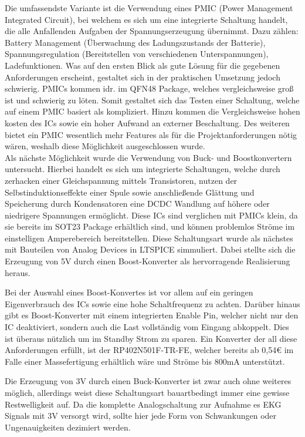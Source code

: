 Die umfassendste Variante ist die Verwendung eines PMIC (Power Management Integrated Circuit), bei welchem es sich um eine integrierte Schaltung handelt, die alle Anfallenden Aufgaben der Spannungserzeugung übernimmt. Dazu zählen: Battery Management (Überwachung des Ladungszustands der Batterie), Spannungsregulation (Bereitstellen von verschiedenen Unterspannungen), Ladefunktionen. Was auf den ersten Blick als gute Lösung für die gegebenen Anforderungen erscheint, gestaltet sich in der praktischen Umsetzung jedoch schwierig. PMICs kommen idr. im QFN48 Package, welches vergleichsweise groß ist und schwierig zu löten. Somit gestaltet sich das Testen einer Schaltung, welche auf einem PMIC basiert als kompliziert. Hinzu kommen die Vergleichsweise hohen kosten des ICs sowie ein hoher Aufwand an externer Beschaltung. Des weiteren bietet ein PMIC wesentlich mehr Features als für die Projektanforderungen nötig wären, weshalb diese Möglichkeit ausgeschlossen wurde.\\

Als nächste Möglichkeit wurde die Verwendung von Buck- und Boostkonvertern untersucht. Hierbei handelt es sich um integrierte Schaltungen, welche durch zerhacken einer Gleichspannung mittels Transistoren, nutzen der Selbstinduktionseffekte einer Spule sowie anschließende Glättung und Speicherung durch Kondensatoren eine DCDC Wandlung auf höhere oder niedrigere Spannungen ermöglicht. Diese ICs sind verglichen mit PMICs klein, da sie bereits im SOT23 Package erhältlich sind, und können problemlos Ströme im einstelligen Amperebereich bereitstellen. 
Diese Schaltungsart wurde als nächstes mit Bauteilen von Analog Devices in LTSPICE simmuliert. Dabei stellte sich die Erzeugung von 5V durch einen Boost-Konverter als hervorragende Realisierung heraus.

Bei der Auswahl eines Boost-Konvertes ist vor allem auf ein geringen Eigenverbrauch des ICs sowie eine hohe Schaltfrequenz zu achten. Darüber hinaus gibt es Boost-Konverter mit einem integrierten Enable Pin, welcher nicht nur den IC deaktiviert, sondern auch die Last vollständig vom Eingang abkoppelt. Dies ist überaus nützlich um im Standby Strom zu sparen. Ein Konverter der all diese Anforderungen erfüllt, ist der RP402N501F-TR-FE, welcher bereits ab 0,54€ im Falle einer Massefertigung erhältlich wäre und Ströme bis 800mA unterstützt.


Die Erzeugung von 3V durch einen Buck-Konverter ist zwar auch ohne weiteres möglich, allerdings weist diese Schaltungsart bauartbedingt immer eine gewisse Restwelligkeit auf. Da die komplette Analogschaltung zur Aufnahme es EKG Signals mit 3V versorgt wird, sollte hier jede Form von Schwankungen oder Ungenauigkeiten dezimiert werden.

